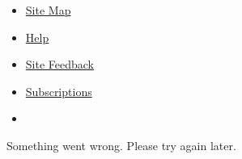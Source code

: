 \begin{itemize}
\item
  \href{http://spiderbites.nytimes.com}{Site Map}
\item
  \href{https://help.nytimes.com/hc/en-us}{Help}
\item
  \href{https://help.nytimes.com/hc/en-us/articles/115015385887-Contact-us}{Site
  Feedback}
\item
  \href{https://www.nytimes.com/subscriptions/Multiproduct/lp5558.html?campaignId=37WXW}{Subscriptions}
\item
\end{itemize}

Something went wrong. Please try again later.
